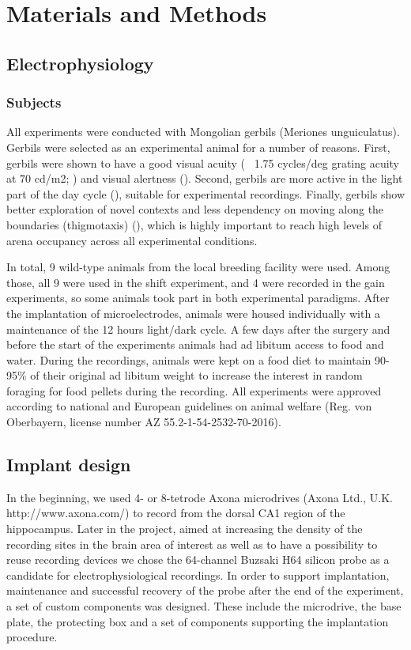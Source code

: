 \chapter{Materials and Methods}
\label{ch:methods}

\section{Electrophysiology}
\label{sec:ephys}

\subsection{Subjects}

All experiments were conducted with Mongolian gerbils (Meriones unguiculatus). Gerbils were selected as an experimental animal for a number of reasons. First, gerbils were shown to have a good visual acuity (~ 1.75 cycles/deg grating acuity at 70 cd/m2; \cite{Baker1983}) and visual alertness (\cite{Ingle1981}). Second, gerbils are more active in the light part of the day cycle (\cite{Naumov1975}), suitable for experimental recordings. Finally, gerbils show better exploration of novel contexts and less dependency on moving along the boundaries (thigmotaxis) (\cite{STUERMER2003249}), which is highly important to reach high levels of arena occupancy across all experimental conditions.

In total, 9 wild-type animals from the local breeding facility were used. Among those, all 9 were used in the shift experiment, and 4 were recorded in the gain experiments, so some animals took part in both experimental paradigms. After the implantation of microelectrodes, animals were housed individually with a maintenance of the 12 hours light/dark cycle. A few days after the surgery and before the start of the experiments animals had ad libitum access to food and water. During the recordings, animals were kept on a food diet to maintain 90-95\% of their original ad libitum weight to increase the interest in random foraging for food pellets during the recording. All experiments were approved according to national and European guidelines on animal welfare (Reg. von Oberbayern, license number AZ 55.2-1-54-2532-70-2016).


\section{Implant design}
\label{sec:implant_design}

In the beginning, we used 4- or 8-tetrode Axona microdrives (Axona Ltd., U.K. http://www.axona.com/) to record from the dorsal CA1 region of the hippocampus. Later in the project, aimed at increasing the density of the recording sites in the brain area of interest as well as to have a possibility to reuse recording devices we chose the 64-channel Buzsaki H64 silicon probe as a candidate for electrophysiological recordings. In order to support implantation, maintenance and successful recovery of the probe after the end of the experiment, a set of custom components was designed. These include the microdrive, the base plate, the protecting box and a set of components supporting the implantation procedure.

